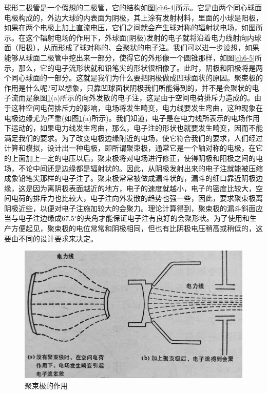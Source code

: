 球形二极管是一个假想的二极管，它的结构如图\ref{ch6-4}所示。它是由两个同心球面电极构成的，外边大球的内表面为阴极，其上涂有发射材料，里面的小球是阳极，如果在两个电极上加上直流电压，它们之间就会产生球对称的辐射状电场，如图所示。在这个辐射电场的作用下，外球面(阴极)发射的电子就将沿着电力线射向内球面（阳极），从而形成了球对称的、会聚状的电子注。我们可以进一步设想，如果能够从球面二极管中挖出来一部分，使得它的外形像一个圆锥那样，如图\ref{ch6-5}所示，那么，它的电子流形状就和铅笔尖的形状很相像了。此时，阴极和阳极将是两个同心球面的一部分。这就是我们为什么要把阴极做成凹球面状的原因。聚束极的作用是什么呢?可以想象，只靠凹球面状阴极我们所能得到的，并不是会聚状的电子流而是象图\ref{ch6-6}(a)所示的向外发散的电子注，这是由于空间电荷排斥力造成的。由于这种空间电荷排斥力的影响，电场将发生畸变，电力线要发生弯曲，这种现象在电极边缘尤为严重(如图\ref{ch6-6}(a)所示)。我们知道，电子是在电力线所表示的电场作用下运动的，如果电力线发生弯曲，那么，电子注的形状也就要发生畸变，因而不能满足我们的要求。为了改变电极边缘附近的电场，使它符合我们的要求，人们经过计算和模拟，设计出一种电极，即所谓聚束极，通常它是一个轴对称的电极，在它的上面加上一定的电压以后，聚束极将对电场进行修正，使得阴极和阳极之间的电场，不论中间还是边缘都是辐射状的。因此，从阴极发射出来的电子注就能被压缩成象铅笔尖那样的电子注了。聚束极常常被做成漏斗状的，漏斗的细口靠近阴极边缘，这是因为离阴极表面越近的地方，电子的速度就越小，电子的密度比较大，空间电荷的排斥力也比较大，电子注向外发散的趋势也强一些，因此，要求聚束极离阴极近些，以便对电子注施加较大的会聚力。理论计算得到，聚束极的漏斗斜面应当与电子注边缘成67.5$  {}^{\circ}$的夹角才能保证电子注有良好的会聚形状。为了使用和生产方便起见，聚束极的电位常常和阴极相同，但也有比阴极电压稍高或稍低的，这要由不同的设计要求来决定。

\begin{figure}[phtb]
	\centering
	\includegraphics[width=0.75\linewidth]{figure/ch6-6}
	\caption{聚束极的作用}
	\label{ch6-6}
\end{figure}

